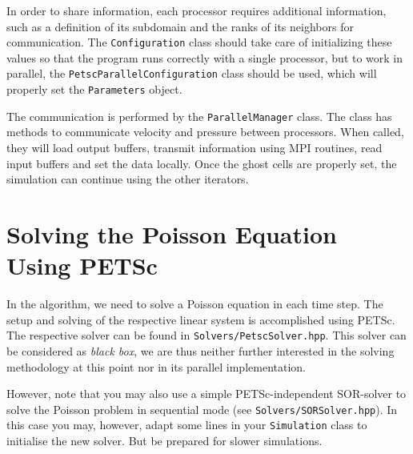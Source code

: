 \documentclass[pdftex,A4]{article}
\begin{document}
In order to share information, each processor requires additional information, such as a definition of its subdomain and the ranks of its neighbors for communication. The {\tt Configuration} class should take care of initializing these values so that the program runs correctly with a single processor, but to work in parallel, the {\tt PetscParallelConfiguration} class should be used, which will properly set the {\tt Parameters} object.

The communication is performed by the {\tt ParallelManager} class. The class has methods to communicate velocity and pressure between processors. When called, they will load output buffers, transmit information using MPI routines, read input buffers and set the data locally. Once the ghost cells are properly set, the simulation can continue using the other iterators.

\section{Solving the Poisson Equation Using PETSc}\label{sec:solving_the_poisson_equation_using_petsc}
In the algorithm, we need to solve a Poisson equation in each time step.
The setup and solving of the respective linear system is accomplished using PETSc. The respective solver can be found in {\tt Solvers/PetscSolver.hpp}.
This solver can be considered as {\it black box}, we are thus neither further interested in the solving methodology at this point nor in its parallel implementation.

However, note that you may also use a simple PETSc-independent SOR-solver to solve the Poisson problem in sequential mode (see {\tt Solvers/SOR\-Solver.hpp}).
In this case you may, however, adapt some lines in your {\tt Simulation} class to initialise the new solver. But be prepared for slower simulations.
\end{document}

